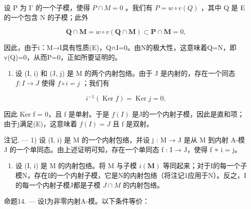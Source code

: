 设 P 为 I' 的一个子模，使得 \(P \cap M = 0\) 。我们有 \(P = w \circ v(Q)\) ，其中 Q 是 E 的一个包含 N 的子模；此外

\[
\mathbf {Q} \cap \mathbf {M} = w \circ v (\mathbf {Q} \cap \mathbf {M}) \subset \mathbf {P} \cap \mathbf {M} = 0,
\]

因此，由于i：M→I具有性质(E)，Q∩I=0。由N的极大性，这意味着Q=N，即v(Q)=0，从而P=0，正如所要证明的。

\begin{enumerate}
\def\labelenumi{\alph{enumi})}
\setcounter{enumi}{1}
\tightlist
\item
  设 (I, i) 和 (J, j) 是 M 的两个内射包络。由于 J 是内射的，存在一个同态 \(f: I \to J\) 使得 \(f \circ i = j\) ；我们有
\end{enumerate}

\[
i ^ {- 1} (\operatorname{Ker} f) = \operatorname{Ker} j = 0,
\]

因此 Ker f = 0，且 f 是单射。于是 \(f(I)\) 是J的一个内射子模，因此是直和项；由于j满足(E)，这意味着 \(f(I) = J\) 且 f 是双射。

注记. --- 1) 设 (I, i) 是 M 的一个内射包络，并设 j : M → J 是从 M 到内射 A-模 J 的一个单同态。由上述证明可知，存在一个单同态 f : I → J，使得 f ∘ i = j。

\begin{enumerate}
\def\labelenumi{\arabic{enumi})}
\setcounter{enumi}{1}
\tightlist
\item
  设 (I, i) 是 M 的内射包络。将 M 与子模 \(i(\mathbf{M})\) 等同起来；对于I的每一个子模N，存在I的一个内射子模，它是N的内射包络（将注记1应用于N）。反之，I的每一个内射子模J都是子模 \(J \cap M\) 的内射包络。
\end{enumerate}

命题14. --- 设I为非零内射A-模。以下条件等价：


